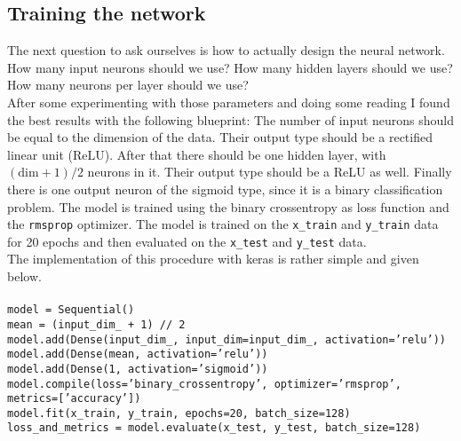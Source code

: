 \subsection{Training the network}\label{subsec:code:training}

The next question to ask ourselves is how to actually design the neural network.
How many input neurons should we use?
How many hidden layers should we use?
How many neurons per layer should we use?\\
After some experimenting with those parameters and doing some reading I found the best results with the following blueprint:
The number of input neurons should be equal to the dimension of the data.
Their output type should be a rectified linear unit (ReLU).
After that there should be one hidden layer, with $(\text{dim} + 1) / 2$ neurons in it.
Their output type should be a ReLU as well.
Finally there is one output neuron of the sigmoid type, since it is a binary classification problem.
The model is trained using the binary crossentropy as loss function and the \texttt{rmsprop} optimizer.
The model is trained on the \texttt{x\_train} and \texttt{y\_train} data for 20 epochs and then evaluated on the \texttt{x\_test} and \texttt{y\_test} data.\\
The implementation of this procedure with keras is rather simple and given below.
\\
\\
\texttt{model = Sequential()\\
mean = (input\_dim\_ + 1) // 2\\
model.add(Dense(input\_dim\_, input\_dim=input\_dim\_, activation='relu'))\\
model.add(Dense(mean, activation='relu'))\\
model.add(Dense(1, activation='sigmoid'))\\
model.compile(loss='binary\_crossentropy', optimizer='rmsprop',\\
\indent metrics=['accuracy'])\\
model.fit(x\_train, y\_train, epochs=20, batch\_size=128)\\
loss\_and\_metrics = model.evaluate(x\_test, y\_test, batch\_size=128)}
